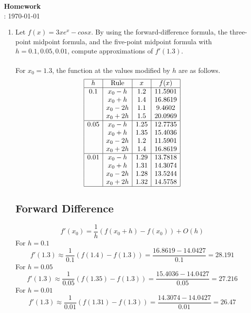 \documentclass[12pt]{article}
\title{}
\author{Josh Morales}
\date{\today}
\begin{document}
\pagestyle{fancy}
\begin{center}
\textbf{\Large Homework } \\
: \today
\end{center}
\begin{enumerate}[leftmargin=2em]
    \item Let $f (x) = 3xe^x - cos x$. By using the forward-difference formula, the three-point
    midpoint formula, and the five-point midpoint formula with $h = 0.1, 0.05,
    0.01$, compute approximations of $f'(1.3)$.\\
    \\For $x_0=1.3$, the function at the values modified by $h$ are as follows.
    \[
    \begin{array}{|c|c|c|c|}
    \hline
    h & \text{Rule} & x & f(x) \\
    \hline
    0.1  & x_0 - h  & 1.2  & 11.5901  \\
         & x_0 + h  & 1.4  & 16.8619  \\
         & x_0 - 2h & 1.1  & 9.4602   \\
         & x_0 + 2h & 1.5  & 20.0969  \\
    \hline
    0.05 & x_0 - h  & 1.25 & 12.7735  \\
         & x_0 + h  & 1.35 & 15.4036  \\
         & x_0 - 2h & 1.2  & 11.5901  \\
         & x_0 + 2h & 1.4  & 16.8619  \\
    \hline
    0.01 & x_0 - h  & 1.29 & 13.7818  \\
         & x_0 + h  & 1.31 & 14.3074  \\
         & x_0 - 2h & 1.28 & 13.5244  \\
         & x_0 + 2h & 1.32 & 14.5758  \\
    \hline
    \end{array}
    \]
    
    \subsection*{Forward Difference}
    \[
    f'(x_0) = \frac{1}{h}(f(x_0+h)-f(x_0)) + O(h)
    \]
    For $h = 0.1$
    \[
    f'(1.3) \approx \frac{1}{0.1}(f(1.4)-f(1.3)) = \frac{16.8619-14.0427}{0.1} = 28.191
    \]
    For $h = 0.05$
    \[
    f'(1.3) \approx \frac{1}{0.05}(f(1.35)-f(1.3)) = \frac{15.4036-14.0427}{0.05} = 27.216
    \]
    For $h=0.01$
    \[
    f'(1.3) \approx \frac{1}{0.01}(f(1.31)-f(1.3)) = \frac{14.3074-14.0427}{0.01} = 26.47
    \]

\end{enumerate}
\end{document}
